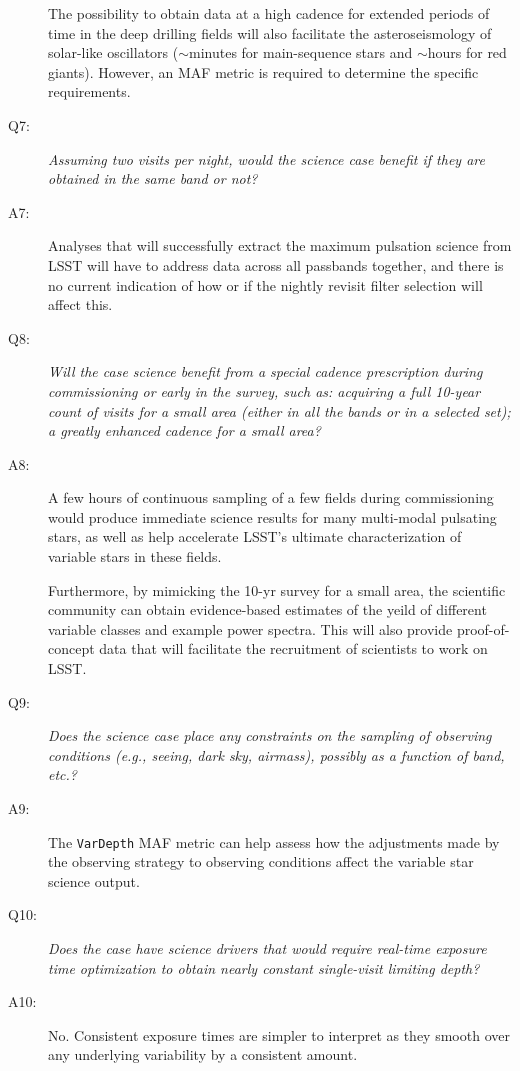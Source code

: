 \begin{description}
 The possibility to obtain data at a high cadence for extended periods of time in the deep drilling fields will also facilitate the asteroseismology of solar-like oscillators ($\sim$minutes for main-sequence stars and $\sim$hours for red giants). However, an MAF metric is required to determine the specific requirements.

 \item[Q7:] {\it Assuming two visits per night, would the science case
 benefit if they are obtained in the same band or not?}

 \item[A7:] Analyses that will successfully extract the maximum pulsation
 science from LSST will have to address data across all passbands together,
 and there is no current indication of how or if the nightly revisit filter selection
 will affect this.

 \item[Q8:] {\it Will the case science benefit from a special cadence
 prescription during commissioning or early in the survey, such as:
 acquiring a full 10-year count of visits for a small area (either in all
 the bands or in a  selected set); a greatly enhanced cadence for a small
 area?}

 \item[A8:] A few hours of continuous sampling of a few fields during
 commissioning would produce immediate science results for many
 multi-modal pulsating stars, as well as help accelerate LSST's ultimate
 characterization of variable stars in these fields.

 Furthermore, by mimicking the 10-yr survey for a small area, the scientific community can obtain evidence-based estimates of the yeild of different variable classes and example power spectra. This will also provide proof-of-concept data that will facilitate the recruitment of scientists to work on LSST.


 \item[Q9:] {\it Does the science case place any constraints on the
 sampling of observing conditions (e.g., seeing, dark sky, airmass),
 possibly as a function of band, etc.?}

 \item[A9:] The {\tt VarDepth} MAF metric can help assess how the
 adjustments made by the observing strategy to observing conditions
 affect the variable star science output.


 \item[Q10:] {\it Does the case have science drivers that would require
 real-time exposure time optimization to obtain nearly constant
 single-visit limiting depth?}

 \item[A10:] No. Consistent exposure times are simpler to interpret as they
 smooth over any underlying variability by a consistent amount.

 \end{description}


\navigationbar
